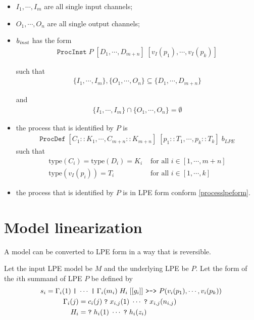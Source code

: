 \begin{itemize}
\item $I_1, \cdots{}, I_m$ are all single input channels;
\item $O_1, \cdots{}, O_n$ are all single output channels;
\item $b_\text{\textit{inst}}$ has the form
\begin{align*}
\texttt{ProcInst} \; P \; [D_1, \cdots{}, D_{m+n}] \; [v_I(p_1), \cdots{}, v_I(p_k)]
\end{align*}

such that
\begin{align*}
\{ I_1, \cdots{}, I_m \}, \{ O_1, \cdots{}, O_n \} \subseteq \{ D_1, \cdots{}, D_{m+n} \}
\end{align*}

and
\begin{align*}
\{ I_1, \cdots{}, I_m \} \cap \{ O_1, \cdots{}, O_n \} = \emptyset{}
\end{align*}

\item the \txs{} process that is identified by $P$ is
\begin{align*}
\texttt{ProcDef} \; [C_1 :: K_1, \cdots{}, C_{m+n} :: K_{m+n}] \; [p_1 :: T_1, \cdots{}, p_k :: T_k] \; b_\textit{LPE}
\end{align*}
such that
\begin{align*}
\text{type}(C_i) = \text{type}(D_i) = K_i &\text{ for all } i \in [1, \cdots{}, m+n] \\
\text{type}(v_I(p_i)) = T_i &\text{ for all } i \in [1, \cdots{}, k]
\end{align*}

\item the \txs{} process that is identified by $P$ is in LPE form conform \ref{processlpeform}.
\end{itemize}

\section{Model linearization}

A model can be converted to LPE form in a way that is reversible.

Let the input LPE model be $M$ and the underlying LPE be $P$.
Let the form of the $i$th summand of LPE $P$ be defined by 
\begin{align*}
s_i = \Gamma_i(1) \; \texttt{|} \; &\cdots{} \; \texttt{|} \; \Gamma_i(m_i) \; H_i \; [[g_i]] \text{ \texttt{>->} } P(v_i(p_1), \cdots{}, v_i(p_k)) \\
\Gamma_i(j) &= c_i(j) \; \texttt{?} \; x_{i,j}(1) \; \cdots{} \; \texttt{?} \; x_{i,j}(n_{i,j}) \\
H_i &= \texttt{?} \; h_{i}(1) \; \cdots{} \; \texttt{?} \; h_{i}(z_{i})
\end{align*}


